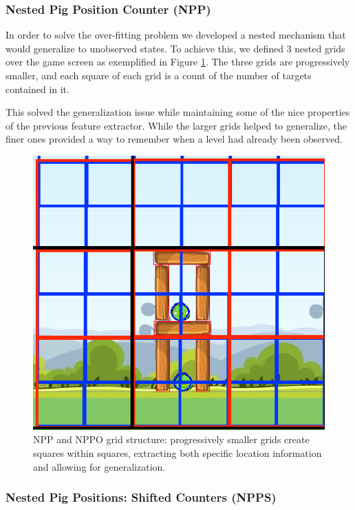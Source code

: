 \documentclass[fleqn,10pt]{SelfArx} %
\begin{document}
\subsubsection{Nested Pig Position Counter (NPP)}

In order to solve the over-fitting problem we developed a nested mechanism that would generalize to unobserved states. To achieve this, we defined 3 nested grids over the game screen as exemplified in Figure \ref{fig:grid}. The three grids are progressively smaller, and each square of each grid is a count of the number of targets contained in it. 

This solved the generalization issue while maintaining some of the nice properties of the previous feature extractor. While the larger grids helped to generalize, the finer ones provided a way to remember when a level had already been observed. 

\begin{figure}[ht]\centering
\includegraphics[width=\linewidth]{Grid.png}
\caption{NPP and NPPO grid structure: progressively smaller grids create squares within squares, extracting both specific location information and allowing for generalization.}
\label{fig:grid}
\end{figure}


\subsubsection{Nested Pig Positions: Shifted Counters (NPPS)}
\end{document}
